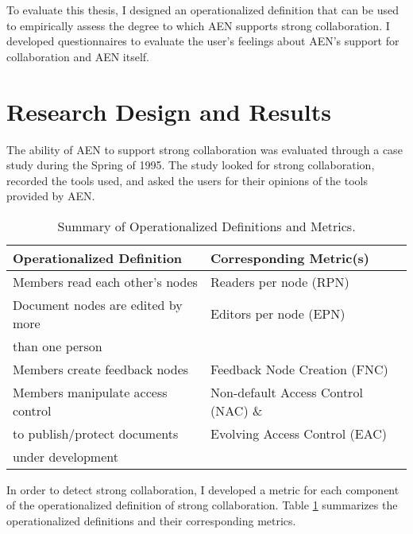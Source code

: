 To evaluate this thesis, I designed an operationalized definition that
can be used to empirically assess the degree to which AEN supports strong
collaboration.  I developed questionnaires to evaluate the user's feelings
about AEN's support for collaboration and AEN itself.

\section{Research Design and Results}

The ability of AEN to support strong collaboration was evaluated through a
case study during the Spring of 1995.  The study looked for strong
collaboration, recorded the tools used, and asked the users for their
opinions of the tools provided by AEN.

\small
\begin{table}[htb]
  \caption{Summary of Operationalized Definitions and Metrics.}
  \begin{center}
    \begin{tabular}{|l|l|}
      \hline
      {\rule[-3mm]{0mm}{8mm}{\bf Operationalized
      Definition }}& {\rule[-3mm]{0mm}{8mm}{\bf Corresponding Metric(s)}}\\ \hline
      \hline
      Members read each other's nodes&Readers per node (RPN)\\ \hline
      Document nodes are edited by more&Editors per node
      (EPN)\\
      than one person&\\\hline
      Members create feedback nodes&Feedback Node Creation (FNC)\\ \hline
      Members manipulate access control &Non-default
      Access Control (NAC) \&\\
      to publish/protect documents &Evolving Access Control (EAC)\\ 
      under development&\\\hline
    \end{tabular}
    \label{tab:op-metrics}
  \end{center}
\end{table}
\normalsize

In order to detect strong collaboration, I developed a metric for each
component of the operationalized definition of strong collaboration. Table
\ref{tab:op-metrics} summarizes the operationalized definitions and their
corresponding metrics.

